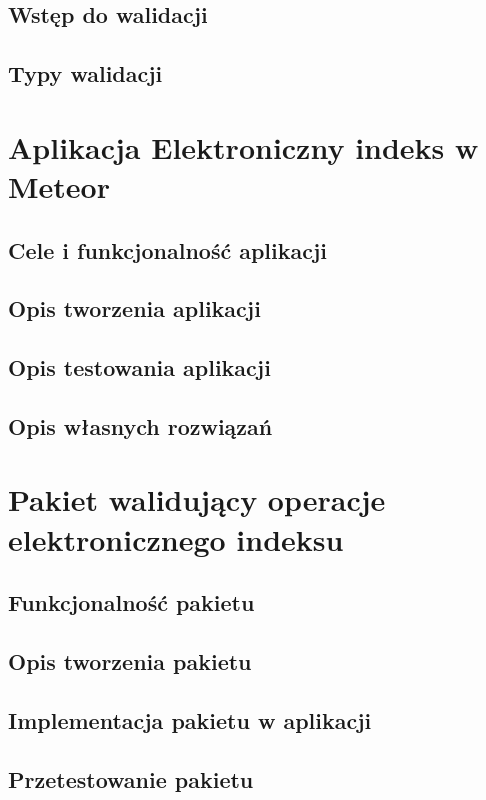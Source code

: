 \documentclass[brudnopis]{xmgr}
\begin{document}
\section{Wstęp do walidacji}
\cite{Validation}
\section{Typy walidacji}

\chapter{Aplikacja Elektroniczny indeks w Meteor}

\section{Cele i funkcjonalność aplikacji}
\section{Opis tworzenia aplikacji}
\cite{Introduction}
\cite{MeteorDocs}
\cite{DiscoverMeteor2013}
\cite{NodeDocs}
\cite{MongoDocs}
\cite{ScalingMongoDB2011}
\cite{ScalingWithMongoDB}
\section{Opis testowania aplikacji}
\cite{Laika}
\section{Opis własnych rozwiązań}


\chapter{Pakiet walidujący operacje elektronicznego indeksu}

\section{Funkcjonalność pakietu}
\section{Opis tworzenia pakietu}
\cite{Packages}
\cite{MeteorDocs}
\cite{DiscoverMeteor2013}
\section{Implementacja pakietu w aplikacji}
\section{Przetestowanie pakietu}
\cite{TinyTest}
\end{document}
